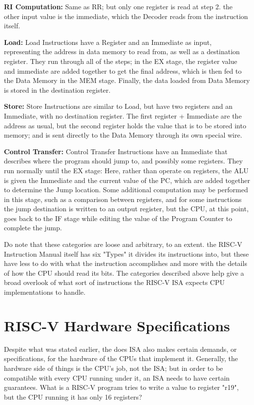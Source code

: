 \documentclass[12pt,twoside]{reedthesis}
\begin{document}
\textbf{RI Computation:} Same as RR; but only one register is read at step 2. the other input value is the immediate, which the Decoder reads from the instruction itself.

\textbf{Load:} Load Instructions have a Register and an Immediate as input, representing the address in data memory to read from, as well as a destination register. They run through all of the steps; in the EX stage, the register value and immediate are added together to get the final address, which is then fed to the Data Memory in the MEM stage. Finally, the data loaded from Data Memory is stored in the destination register.

\textbf{Store:} Store Instructions are similar to Load, but have two registers and an Immediate, with no destination register. The first register + Immediate are the address as usual, but the second register holds the value that is to be stored into memory; and is sent directly to the Data Memory through its own special wire.

\textbf{Control Transfer:} Control Transfer Instructions have an Immediate that describes where the program should jump to, and possibly some registers. They run normally until the EX stage: Here, rather than operate on registers, the ALU is given the Immediate and the current value of the PC, which are added together to determine the Jump location. Some additional computation may be performed in this stage, such as a comparison between registers, and for some instructions the jump destination is written to an output register, but the CPU, at this point, goes back to the IF stage while editing the value of the Program Counter to complete the jump.

Do note that these categories are loose and arbitrary, to an extent. the RISC-V Instruction Manual itself has six "Types" it divides its instructions into, but these have less to do with what the instruction accomplishes and more with the details of how the CPU should read its bits. The categories described above help give a broad overlook of what sort of instructions the RISC-V ISA expects CPU implementations to handle.

\section{RISC-V Hardware Specifications}

Despite what was stated earlier, the does ISA also makes certain demands, or specifications, for the hardware of the CPUs that implement it. Generally, the hardware side of things is the CPU's job, not the ISA; but in order to be compatible with every CPU running under it, an ISA needs to have certain guarantees. What is a RISC-V program tries to write a value to register "r19", but the CPU running it has only 16 registers?
\end{document}
